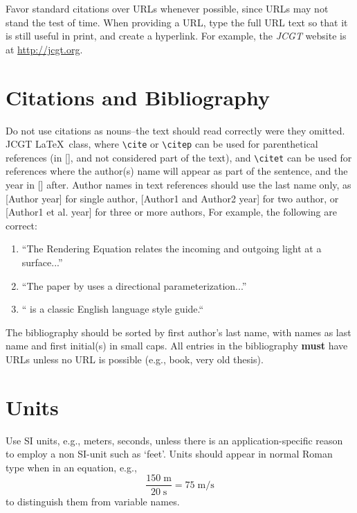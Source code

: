 \documentclass{jcgt}
\begin{document}
Favor standard citations over URLs whenever possible, since URLs may not stand the test of time.  When providing a URL, type the full URL text so that it is still useful in print, and create a hyperlink.  For example,
the \textit{JCGT} website is at \href{http://jcgt.org}{http://jcgt.org}.

\section{Citations and Bibliography}
Do not use citations as nouns--the text should read correctly were they omitted. JCGT \LaTeX\ class, where \lstinline{\cite} or \lstinline{\citep} can be used for parenthetical references (in [], and not considered part of the text), and \lstinline{\citet} can be used for references where the author(s) name will appear as part of the sentence, and the year in [] after. Author names in text references should use the last name only, as [Author year] for single author, [Author1 and Author2 year] for two author, or [Author1 et al. year] for three or more authors, For example, the following are correct:

\begin{enumerate}
\item ``The Rendering Equation \cite{Immel:1986:RMN:15886.15901,Kajiya:1986:RE:15922.15902} relates the incoming and outgoing light at a surface...''
\item ``The paper by \citet{Immel:1986:RMN:15886.15901} uses a directional parameterization...''
\item `` is a classic English language style guide.``
\end{enumerate}

\noindent The bibliography should be sorted by first author's last name, with names as last name and first initial(s) in small caps. All entries in the bibliography \textbf{must} have URLs unless no URL is possible (e.g., book, very old thesis).

\section{Units}
Use SI units, e.g., meters, seconds, unless there is an application-specific reason to employ a non SI-unit such as `feet'.  Units should appear in normal Roman type when in an equation, e.g.,
%
\begin{equation}
\frac{150\;\mathrm{m}}{20\;\mathrm{s}} = 75\;\mathrm{m}/\mathrm{s}
\end{equation}
%
to distinguish them from variable names.
\end{document}
